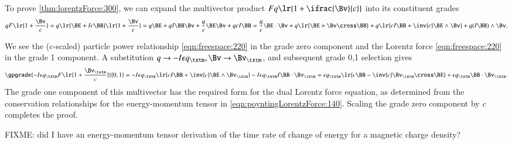 To prove
\cref{thm:lorentzForce:300},
we can expand the multivector product
\( F q \lr{ 1 + \ifrac{\Bv}{c} } \) into its constituent grades
\begin{dmath}\label{eqn:lorentzForce:40}
q F \lr{ 1 + \frac{\Bv}{c} }
=
q
\lr{ \BE + I c \BB }
\lr{ 1 + \frac{\Bv}{c} }
=
q \BE
+ q I \BB \Bv
+ \frac{q}{c} \BE \Bv
+ q c I \BB
=
  \frac{q}{c} \BE \cdot \Bv
+ q \lr{ \BE + \Bv \cross \BB }
+ q \lr{ c I \BB + \inv{c} \BE \wedge \Bv }
+ q (I \BB) \wedge \Bv.
\end{dmath}

We see the (c-scaled) particle power relationship
\cref{eqn:freespace:220}
in the grade zero component and the Lorentz force \cref{eqn:freespace:220} in the grade 1 component.
A substitution \( q \rightarrow -I \epsilon q_\txtm, \Bv \rightarrow \Bv_\txtm \), and subsequent grade 0,1 selection gives
\begin{dmath}\label{eqn:lorentzForce:320}
\gpgrade{
-I \epsilon q_\txtm F \lr{ 1 + \frac{\Bv_\txtm}{c} }
}{0,1}
=
- I \epsilon q_\txtm \lr{ c I \BB + \inv{c} \BE \wedge \Bv_\txtm }
- I \epsilon q_\txtm I \BB \cdot \Bv_\txtm
=
\epsilon q_\txtm \lr{ c \BB - \inv{c} \Bv_\txtm \cross \BE }
+
\epsilon q_\txtm \BB \cdot \Bv_\txtm.
\end{dmath}
The grade one component of this multivector has the
required form for the dual Lorentz force equation, as determined from the conservation relationships for the energy-momentum tensor in
\cref{eqn:poyntingLorentzForce:140}.
Scaling the grade zero component by \( c \) completes the proof.

FIXME: did I have an energy-momentum tensor derivation of the time rate of change of energy for a magnetic charge density?

